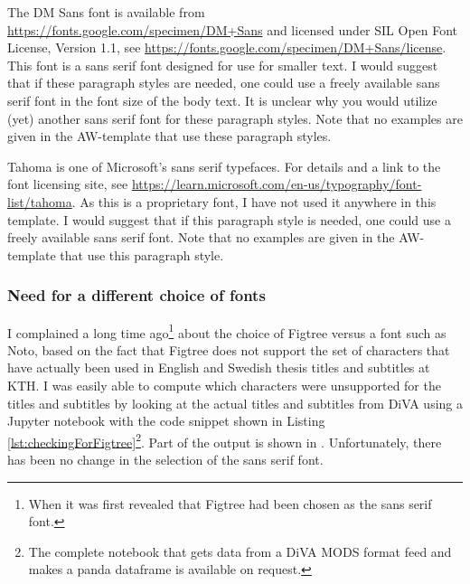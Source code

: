 \documentclass[12pt, twoside]{article}
\begin{document}
The DM Sans font is available from \url{https://fonts.google.com/specimen/DM+Sans} and licensed under SIL Open Font License, Version 1.1, see \url{https://fonts.google.com/specimen/DM+Sans/license}. This font is a sans serif font designed for use for smaller text. I would suggest that if these paragraph styles are needed, one could use a freely available sans serif font in the font size of the body text. It is unclear why you would utilize (yet) another sans serif font for these paragraph styles. Note that no examples are given in the AW-template that use these paragraph styles.

Tahoma is one of Microsoft's sans serif typefaces. For details and a link to the font licensing site, see \url{https://learn.microsoft.com/en-us/typography/font-list/tahoma}. As this is a proprietary font, I have not used it anywhere in this template. I would suggest that if this paragraph style is needed, one could use a freely available sans serif font. Note that no examples are given in the AW-template that use this paragraph style.



\subsubsection{Need for a different choice of fonts}
\label{sec:cycle3ChooseBetterFonts}
I complained a long time ago\footnote{When it was first revealed that Figtree had been chosen as the sans serif font.} about the choice of Figtree versus a font such as Noto, based on the fact that Figtree does not support the set of characters that have actually been used in English and Swedish thesis titles and subtitles at KTH. I was easily able to compute which characters were unsupported for the titles and subtitles by looking at the actual titles and subtitles from DiVA using a Jupyter notebook with the code snippet shown in Listing \ref{lst:checkingForFigtree}\footnote{The complete notebook that gets data from a DiVA MODS format feed and makes a panda dataframe is available on request.}. Part of the output is shown in .
Unfortunately, there has been no change in the selection of the sans serif font. 
\end{document}
